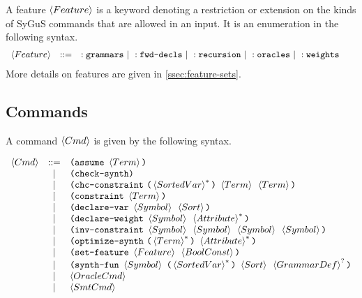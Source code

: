 \documentclass[english,a4paper,10pt]{article}
\begin{document}
A feature $\feature$ is a keyword denoting a restriction or extension
on the kinds of SyGuS commands that are allowed in an input.
It is an enumeration in the following syntax.
\begin{alignat*}{1}
 & \begin{array}{rcl}
 \feature & ::= & :\fgrammarskwd\mbox{ }|\mbox{ }:\ffwddeclskwd\mbox{ }|\mbox{ }:\frecursionkwd\mbox{ }|\mbox{ } :\foracleskwd\mbox{ }|\mbox{ } :\fweightskwd\mbox{ }
\end{array}
\end{alignat*}
More details on features are given in \cref{ssec:feature-sets}.

\subsection{Commands}

A command $\cmd$ is given by the following syntax.

\[
\begin{array}{rcl}
\cmd 
 & ::= & \paren{\assumekwd\mbox{ }\term} \\
 & | & \paren{\checksynthkwd} \\
 & | & \paren{\constraintchckwd\mbox{ }\paren{\kstar{\sortedvar}}\mbox{ }\term\mbox{ }\term} \\
 & | & \paren{\constraintkwd\mbox{ }\term} \\
 & | & \paren{\vardeclkwd\mbox{ }\symbol\mbox{ }\sortexpr}\\ 
 & | & \paren{\weightdeclkwd\mbox{ }\symbol\mbox{ }\kstar{\attribute}} \\
 & | & \paren{\constraintinvkwd\mbox{ }\symbol\mbox{ }\symbol\mbox{ }\symbol\mbox{ }\symbol} \\
 & | & \paren{\optsynthkwd\mbox{ }\paren{\kstar{\term}}\mbox{ }\kstar{\attribute}} \\
 & | & \paren{\setfeaturekwd\mbox{ }\feature\mbox{ }\boolconst} \\
 & | & \paren{\synthfunkwd\mbox{ }\symbol\mbox{ }\paren{\kstar{\sortedvar}}\mbox{ }\sortexpr\mbox{ }\koption{\grammardef}}\\
 & | & \oraclecmd \\
 & | & \smtcmd
\end{array}
\]
\end{document}

